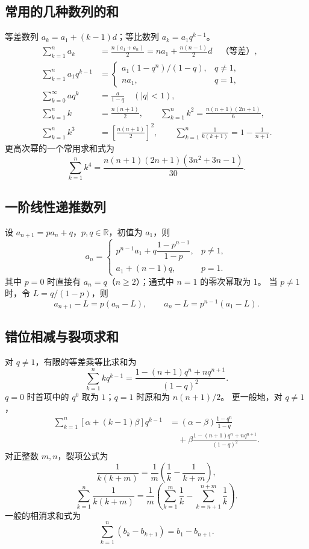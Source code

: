 \documentclass[../main.tex]{subfiles}
\begin{document}
\subsection{常用的几种数列的和}
等差数列 $a_k=a_1+(k-1)d$；等比数列 $a_k=a_1q^{k-1}$。
\begin{align*}
\sum_{k=1}^n a_k&=\frac{n(a_1+a_n)}2=na_1+\frac{n(n-1)}2d\quad\text{（等差）},\\
\sum_{k=1}^n a_1q^{k-1}&=\begin{cases}a_1(1-q^n)/(1-q),&q\ne1,\\na_1,&q=1,\end{cases}\\
\sum_{k=0}^\infty aq^k&=\frac{a}{1-q}\quad(|q|<1),\\
\sum_{k=1}^n k&=\frac{n(n+1)}2,\qquad \sum_{k=1}^n k^2=\frac{n(n+1)(2n+1)}6,\\
\sum_{k=1}^n k^3&=\left[\frac{n(n+1)}2\right]^2,\qquad
\sum_{k=1}^n\frac1{k(k+1)}=1-\frac1{n+1}.
\end{align*}
更高次幂的一个常用求和式为
\[
\sum_{k=1}^n k^4=\frac{n(n+1)(2n+1)(3n^2+3n-1)}{30}.
\]
\subsection{一阶线性递推数列}
设 $a_{n+1}=pa_n+q$，$p,q\in\mathbb R$，初值为 $a_1$，则
\[
a_n=\begin{cases}
p^{n-1}a_1+q\dfrac{1-p^{n-1}}{1-p},&p\ne1,\\[4pt]
a_1+(n-1)q,&p=1.
\end{cases}
\]
其中 $p=0$ 时直接有 $a_n=q$（$n\ge2$）；通式中 $n=1$ 的零次幂取为 $1$。
当 $p\ne1$ 时，令 $L=q/(1-p)$，则
\[
a_{n+1}-L=p(a_n-L),\qquad a_n-L=p^{n-1}(a_1-L).
\]
\subsection{错位相减与裂项求和}
对 $q\ne1$，有限的等差乘等比求和为
\[
\sum_{k=1}^n kq^{k-1}
=\frac{1-(n+1)q^n+nq^{n+1}}{(1-q)^2}.
\]
$q=0$ 时首项中的 $q^0$ 取为 $1$；$q=1$ 时原和为 $n(n+1)/2$。
更一般地，对 $q\ne1$，
\begin{align*}
\sum_{k=1}^n[\alpha+(k-1)\beta]q^{k-1}
&=(\alpha-\beta)\frac{1-q^n}{1-q}\\
&\quad+\beta\frac{1-(n+1)q^n+nq^{n+1}}{(1-q)^2}.
\end{align*}
对正整数 $m,n$，裂项公式为
\[
\frac1{k(k+m)}=\frac1m\left(\frac1k-\frac1{k+m}\right),
\]
\[
\sum_{k=1}^n\frac1{k(k+m)}
=\frac1m\left(\sum_{k=1}^m\frac1k-\sum_{k=n+1}^{n+m}\frac1k\right).
\]
一般的相消求和式为
\[
\sum_{k=1}^n(b_k-b_{k+1})=b_1-b_{n+1}.
\]
\clearpage
\end{document}
